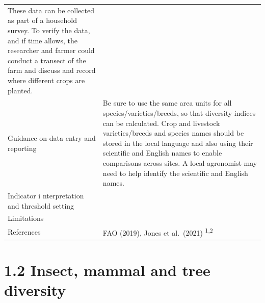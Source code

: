 \documentclass[
  letterpaper,
  DIV=11,
  numbers=noendperiod]{scrreprt}
\begin{document}
\begin{longtable}[]{@{}
  >{\raggedright\arraybackslash}p{}
  >{\raggedright\arraybackslash}p{}@{}}
\begin{minipage}[t]{\linewidth}
These data can be collected as part of a household survey. To verify the
data, and if time allows, the researcher and farmer could conduct a
transect of the farm and discuss and record where different crops are
planted.
\end{minipage} \\
Guidance on data entry and reporting & Be sure to use the same area
units for all species/varieties/breeds, so that diversity indices can be
calculated. Crop and livestock varieties/breeds and species names should
be stored in the local language and also using their scientific and
English names to enable comparisons across sites. A local agronomist may
need to help identify the scientific and English names. \\
Indicator i nterpretation and threshold setting & \\
Limitations & \\
References & FAO (2019), Jones et al.~(2021) \textsuperscript{1,2} \\
\end{longtable}

\chapter{1.2 Insect, mammal and tree
diversity}\label{insect-mammal-and-tree-diversity}
\end{document}

